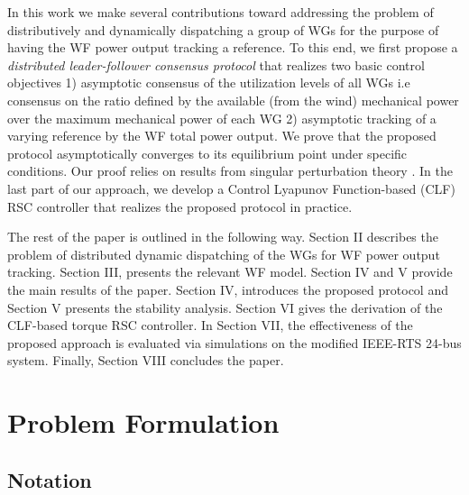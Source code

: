 \documentclass[letterpaper, 10 pt, conference]{ieeeconf}
\begin{document}
\par In this work we make several contributions toward addressing the problem of distributively and dynamically dispatching a group of WGs for the purpose of having the WF power output tracking a reference. To this end, we first propose a \textit{distributed leader-follower consensus protocol} that realizes two basic control objectives 1) asymptotic consensus of the utilization levels of all WGs i.e consensus on the ratio defined by the available (from the wind) mechanical power over the maximum mechanical power of each WG 2)  asymptotic tracking of a varying reference by the         WF total power output. We prove that the proposed protocol asymptotically converges to its equilibrium point under specific conditions. Our proof relies on results from singular  perturbation theory \cite{khalil}. In the last part of our approach, we develop a Control Lyapunov Function-based (CLF) \cite{sontag}  RSC controller that realizes the proposed protocol in practice.
\par The rest of the paper is outlined in the following way. Section II describes the problem of distributed dynamic dispatching of the WGs for WF power output tracking. Section III, presents the relevant WF model. Section IV and V provide the main results of the paper. Section IV, introduces the proposed protocol and Section V presents the stability analysis.  Section VI gives the derivation of  the CLF-based torque RSC controller. In Section VII, the effectiveness of the proposed approach is evaluated via  simulations on the modified IEEE-RTS 24-bus system. Finally, Section VIII concludes the paper.


\section{Problem Formulation}
\subsection{Notation}
\end{document}
